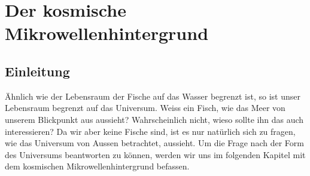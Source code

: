 
	\chapter{Der kosmische Mikrowellenhintergrund\label{chapter:thema}}
	\begin{refsection}
		
		\printbibliography[heading=subbibliography]
	\end{refsection}
	\section{Einleitung}
	Ähnlich wie der Lebensraum der Fische auf das Wasser begrenzt ist, so ist unser Lebensraum begrenzt auf das Universum.
	Weiss ein Fisch, wie das Meer von unserem Blickpunkt aus aussieht?
	Wahrscheinlich nicht, wieso sollte ihn das auch interessieren?
	Da wir aber keine Fische sind, ist es nur natürlich sich zu fragen, wie das Universum von Aussen betrachtet, aussieht.
	Um die Frage nach der Form des Universums beantworten zu können, werden wir uns im folgenden Kapitel mit dem kosmischen Mikrowellenhintergrund befassen.
	
